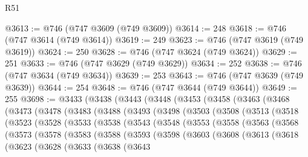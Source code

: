 \begin{lexlean}{R51}
\begin{coremodule}
@3613 := @746 (@747 @3609 (@749 @3609))
@3614 := 248
@3618 := @746 (@747 @3614 (@749 @3614))
@3619 := 249
@3623 := @746 (@747 @3619 (@749 @3619))
@3624 := 250
@3628 := @746 (@747 @3624 (@749 @3624))
@3629 := 251
@3633 := @746 (@747 @3629 (@749 @3629))
@3634 := 252
@3638 := @746 (@747 @3634 (@749 @3634))
@3639 := 253
@3643 := @746 (@747 @3639 (@749 @3639))
@3644 := 254
@3648 := @746 (@747 @3644 (@749 @3644))
@3649 := 255
@3698 := @3433
    (@3438
      (@3443
        (@3448
          (@3453
            (@3458
              (@3463
                (@3468
                  (@3473
                    (@3478
                      (@3483
                        (@3488
                          (@3493
                            (@3498
                              (@3503
                                (@3508
                                  (@3513
                                    (@3518
                                      (@3523
                                        (@3528
                                          (@3533
                                            (@3538
                                              (@3543
                                                (@3548
                                                  (@3553
                                                    (@3558
                                                      (@3563
                                                        (@3568
                                                          (@3573
                                                            (@3578
                                                              (@3583
                                                                (@3588
                                                                  (@3593
                                                                    (@3598
                                                                      (@3603
                                                                        (@3608
                                                                          (@3613
                                                                            (@3618
                                                                              (@3623
                                                                                (@3628
                                                                                  (@3633
                                                                                    (@3638
                                                                                      (@3643

\end{coremodule}
\end{lexlean}
